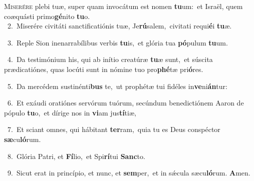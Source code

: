 \lettrine{\initial\textcolor{\initialcolor}{M}}{iserére} plebi tuæ, super quam invocátum est nomen \textbf{tu}\-um:~\star et Israël, quem coæquásti primo\-\textbf{gé}\-nito \textbf{tu}\-o.\\
{\numbfont\textcolor{\numbcolor}{~2.}}~Miserére civitáti sanctificatiónis tuæ, Je\-\textbf{rú}\-salem,~\star civitati requi\-\textbf{é}\-i \textbf{tu}\-æ.\par
{\numbfont\textcolor{\numbcolor}{~3.}}~Reple Sion inenarrabílibus verbis \textbf{tu}\-is,~\star et glória tua \textbf{pó}\-pulum \textbf{tu}\-um.\par
{\numbfont\textcolor{\numbcolor}{~4.}}~Da testimónium his, qui ab inítio creatúræ \textbf{tu}\-æ sunt,~\star et súscita prædicatiónes, quas locúti sunt in nómine tuo pro\-\textbf{phé}\-tæ pri\-\textbf{ó}\-res.\par
{\numbfont\textcolor{\numbcolor}{~5.}}~Da mercédem sustinénti\textbf{bus} te,~\star ut prophétæ tui fidéles in\-\textbf{ve}\-ni\-\textbf{án}\-tur:\par
{\numbfont\textcolor{\numbcolor}{~6.}}~Et exáudi oratiónes servórum tuórum, secúndum benedictiónem Aaron de pópulo \textbf{tu}\-o,~\star et dírige nos in \textbf{vi}\-am jus\-\textbf{tí}\-tiæ,\par
{\numbfont\textcolor{\numbcolor}{~7.}}~Et sciant omnes, qui hábitant \textbf{ter}\-ram,~\star quia tu es Deus conspéctor \textbf{sæ}\-cu\-\textbf{ló}\-rum.\par
{\numbfont\textcolor{\numbcolor}{~8.}}~Glória Patri, et \textbf{Fí}\-lio,~\star et Spi\-\textbf{rí}\-tui \textbf{Sanc}\-to.\par
{\numbfont\textcolor{\numbcolor}{~9.}}~Sicut erat in princípio, et nunc, et \textbf{sem}\-per,~\star et in sǽcula sæcu\-\textbf{ló}\-rum. \textbf{A}\-men.\par
